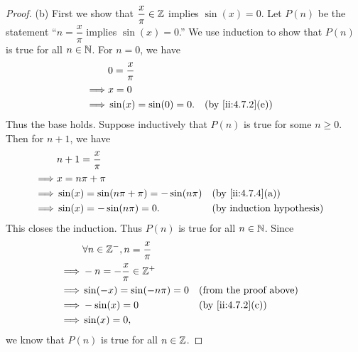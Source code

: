 \begin{proof}{(b)}
  First we show that \(\dfrac{x}{\pi} \in \mathbb{Z}\) implies \(\sin(x) = 0\).
  Let \(P(n)\) be the statement ``\(n = \dfrac{x}{\pi}\) implies \(\sin(x) = 0\).''
  We use induction to show that \(P(n)\) is true for all \(n \in \mathbb{N}\).
  For \(n = 0\), we have
  \begin{align*}
             & 0 = \dfrac{x}{\pi}                           \\
    \implies & x = 0                                        \\
    \implies & \sin(x) = \sin(0) = 0. &  & \by{ii:4.7.2}[e]
  \end{align*}
  Thus the base holds.
  Suppose inductively that \(P(n)\) is true for some \(n \geq 0\).
  Then for \(n + 1\), we have
  \begin{align*}
             & n + 1 = \dfrac{x}{\pi}                                           \\
    \implies & x = n \pi + \pi                                                  \\
    \implies & \sin(x) = \sin(n \pi + \pi) = -\sin(n \pi) &  & \by{ii:4.7.4}[a] \\
    \implies & \sin(x) = -\sin(n \pi) = 0.                &  & \byIH
  \end{align*}
  This closes the induction.
  Thus \(P(n)\) is true for all \(n \in \mathbb{N}\).
  Since
  \begin{align*}
             & \forall n \in \Z^-, n = \dfrac{x}{\pi}                                    \\
    \implies & -n = -\dfrac{x}{\pi} \in \Z^+                                             \\
    \implies & \sin(-x) = \sin(- n \pi) = 0           &  & \text{(from the proof above)} \\
    \implies & -\sin(x) = 0                           &  & \by{ii:4.7.2}[c]              \\
    \implies & \sin(x) = 0,
  \end{align*}
  we know that \(P(n)\) is true for all \(n \in \mathbb{Z}\).


\end{proof}
